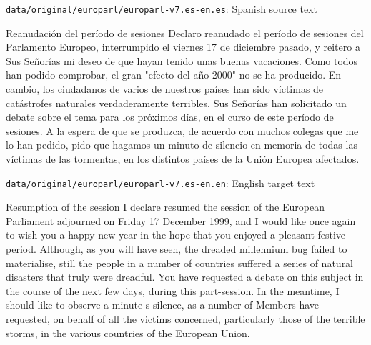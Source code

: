 \documentclass[
  letterpaper,
  DIV=11,
  numbers=noendperiod]{scrreport}
\newenvironment{Shaded}{\begin{snugshade}}{\end{snugshade}}
\newcommand{\NormalTok}[1]{\textcolor[rgb]{0.00,0.00,0.00}{#1}}
\theoremstyle{definition}
\theoremstyle{remark}
\begin{document}
\begin{codelisting}

\caption{\texttt{data/original/europarl/europarl-v7.es-en.es}: Spanish
source text}

\hypertarget{lst-cd-europarl-es}{%
\label{lst-cd-europarl-es}}%
\begin{Shaded}
\begin{Highlighting}[]
\NormalTok{Reanudación del período de sesiones}
\NormalTok{Declaro reanudado el período de sesiones del Parlamento Europeo, interrumpido el viernes 17 de diciembre pasado, y reitero a Sus Señorías mi deseo de que hayan tenido unas buenas vacaciones.}
\NormalTok{Como todos han podido comprobar, el gran "efecto del año 2000" no se ha producido. En cambio, los ciudadanos de varios de nuestros países han sido víctimas de catástrofes naturales verdaderamente terribles.}
\NormalTok{Sus Señorías han solicitado un debate sobre el tema para los próximos días, en el curso de este período de sesiones.}
\NormalTok{A la espera de que se produzca, de acuerdo con muchos colegas que me lo han pedido, pido que hagamos un minuto de silencio en memoria de todas las víctimas de las tormentas, en los distintos países de la Unión Europea afectados.}
\end{Highlighting}
\end{Shaded}

\end{codelisting}

\begin{codelisting}

\caption{\texttt{data/original/europarl/europarl-v7.es-en.en}: English
target text}

\hypertarget{lst-cd-europarl-en}{%
\label{lst-cd-europarl-en}}%
\begin{Shaded}
\begin{Highlighting}[]
\NormalTok{Resumption of the session}
\NormalTok{I declare resumed the session of the European Parliament adjourned on Friday 17 December 1999, and I would like once again to wish you a happy new year in the hope that you enjoyed a pleasant festive period.}
\NormalTok{Although, as you will have seen, the dreaded \textquotesingle{}millennium bug\textquotesingle{} failed to materialise, still the people in a number of countries suffered a series of natural disasters that truly were dreadful.}
\NormalTok{You have requested a debate on this subject in the course of the next few days, during this part{-}session.}
\NormalTok{In the meantime, I should like to observe a minute\textquotesingle{} s silence, as a number of Members have requested, on behalf of all the victims concerned, particularly those of the terrible storms, in the various countries of the European Union.}
\end{Highlighting}
\end{Shaded}

\end{codelisting}
\end{document}

